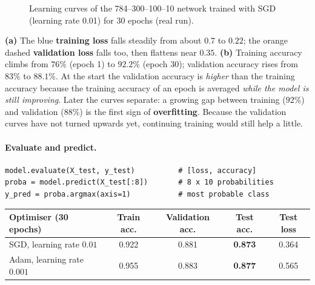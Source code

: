 \begin{figure}[!htbp]
\centering
{}
\caption{Learning curves of the 784--300--100--10 network trained with SGD (learning rate 0.01) for 30 epochs (real run).}\label{fig:learning}
\end{figure}

\begin{explain}
\textbf{(a)} The blue \textbf{training loss} falls steadily from about $0.7$ to $0.22$; the orange dashed \textbf{validation loss} falls too, then flattens near $0.35$. \textbf{(b)} Training accuracy climbs from $76\%$ (epoch 1) to $92.2\%$ (epoch 30); validation accuracy rises from $83\%$ to $88.1\%$. At the start the validation accuracy is \emph{higher} than the training accuracy because the training accuracy of an epoch is averaged \emph{while the model is still improving}. Later the curves separate: a growing gap between training ($92\%$) and validation ($88\%$) is the first sign of \textbf{overfitting}. Because the validation curves have not turned upwards yet, continuing training would still help a little.
\end{explain}

\paragraph{Evaluate and predict.}
\begin{lstlisting}
model.evaluate(X_test, y_test)          # [loss, accuracy]
proba = model.predict(X_test[:8])       # 8 x 10 probabilities
y_pred = proba.argmax(axis=1)           # most probable class
\end{lstlisting}

\begin{center}
\begin{tabular}{@{}lcccc@{}}
\toprule
\textbf{Optimiser (30 epochs)} & \textbf{Train acc.} & \textbf{Validation acc.} & \textbf{Test acc.} & \textbf{Test loss}\\
\midrule
SGD, learning rate $0.01$ & 0.922 & 0.881 & \textbf{0.873} & 0.364\\
Adam, learning rate $0.001$ & 0.955 & 0.883 & \textbf{0.877} & 0.565\\
\bottomrule
\end{tabular}
\end{center}

